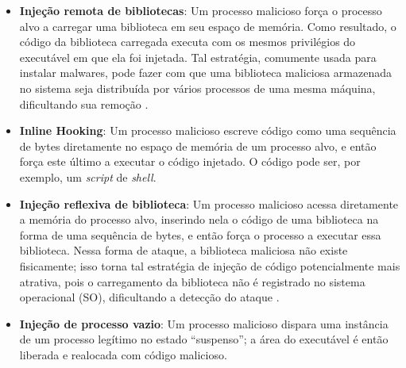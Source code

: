 \begin{itemize}
 \item \textbf{Injeção remota de bibliotecas}: Um processo malicioso força o processo alvo a carregar uma biblioteca em seu espaço de memória.
 Como resultado, o código da biblioteca carregada executa com os mesmos privilégios do executável em que ela foi injetada. 
 Tal estratégia, comumente usada para instalar malwares, pode fazer com que uma biblioteca maliciosa armazenada no sistema seja distribuída por vários processos de uma mesma máquina, dificultando sua remoção \cite{MillerRemoteLibraryInjection:2004}.
 
 \item \textbf{Inline Hooking}: Um processo malicioso escreve código como uma sequência de bytes diretamente no espaço de memória de um processo alvo, e então força este último a executar o código injetado. 
 O código pode ser, por exemplo, um \textit{script} de \textit{shell}.
 

 \item \textbf{Injeção reflexiva de biblioteca}: Um processo malicioso acessa diretamente a memória do processo alvo, inserindo nela o código de uma biblioteca na forma de uma sequência de bytes, e então força o processo a executar essa biblioteca. 
 Nessa forma de ataque, a biblioteca maliciosa não existe fisicamente; isso torna tal estratégia de injeção de código potencialmente mais atrativa, pois o carregamento da biblioteca não é registrado no sistema operacional (SO), dificultando a detecção do ataque \cite{FewerReflectiveLibraryInject:2008}.
 
 \item \textbf{Injeção de processo vazio}: Um processo malicioso dispara uma instância de um processo legítimo no estado ``suspenso''; a área do executável é então liberada e realocada com código malicioso.
\end{itemize}



